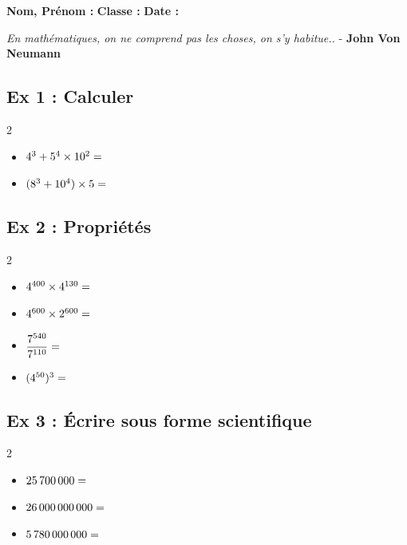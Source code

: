 



\textbf{Nom, Prénom :} \hspace{8cm} \textbf{Classe :} \hspace{3cm} \textbf{Date :}\\


\begin{center}
  \textit{En mathématiques, on ne comprend pas les choses, on s’y habitue..}  - \textbf{John Von Neumann}
\end{center}

\subsection*{Ex 1 : Calculer}

\begin{multicols}{2}
  \begin{itemize}[label={$\bullet$}]
  \item $ 4^{3} + 5^4 \times 10^2 = \dotfill$
  \item $ ( 8^{3} + 10^{4}) \times 5 = \dotfill$
  \end{itemize}
\end{multicols}


\subsection*{Ex 2 : Propriétés}

\begin{multicols}{2}
  \begin{itemize}[label={$\bullet$}]
  \item $ 4^{400} \times 4^{130} = \dotfill$
  \item $ 4^{600} \times 2^{600} = \dotfill$
  \item $ \dfrac{7^{540}}{7^{110}} = \dotfill$
  \item $ (4^{50})^3 = \dotfill$
  \end{itemize}
\end{multicols}


\subsection*{Ex 3 : Écrire sous forme scientifique}
\begin{multicols}{2}
  \begin{itemize}[label={$\bullet$}]
  \item $\SI{25700000}{} = \dotfill$
  \item $\SI{26000000000}{} = \dotfill$
  \item $\SI{5780000000}{} = \dotfill$
  \end{itemize}
\end{multicols}


